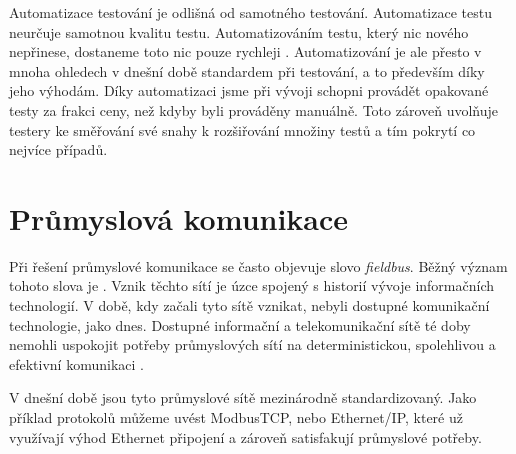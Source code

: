 Automatizace testování je odlišná od samotného testování. Automatizace testu neurčuje samotnou kvalitu testu. Automatizováním testu, který nic nového nepřinese, dostaneme toto nic pouze rychleji \cite{fewster1999software}. Automatizování je ale přesto v mnoha ohledech v dnešní době standardem při testování, a to především díky jeho výhodám. Díky automatizaci jsme při vývoji schopni provádět opakované testy za frakci ceny, než kdyby byli prováděny manuálně. Toto zároveň uvolňuje testery ke směřování své snahy k rozšiřování množiny testů a tím pokrytí co nejvíce případů.



\section{Průmyslová komunikace}

Při řešení průmyslové komunikace se často objevuje slovo \textit{fieldbus}. Běžný význam tohoto slova je  \cite{fieldbus_thomesse}. Vznik těchto sítí je úzce spojený s historií vývoje informačních technologií. V době, kdy začali tyto sítě vznikat, nebyli dostupné komunikační technologie, jako dnes. Dostupné informační a telekomunikační sítě té doby nemohli uspokojit potřeby průmyslových sítí na deterministickou, spolehlivou a efektivní komunikaci \cite{future_of_ind_com}. 

V dnešní době jsou tyto průmyslové sítě mezinárodně standardizovaný. Jako příklad protokolů můžeme uvést ModbusTCP, nebo Ethernet/IP, které už využívají výhod Ethernet připojení a zároveň satisfakují průmyslové potřeby. 
